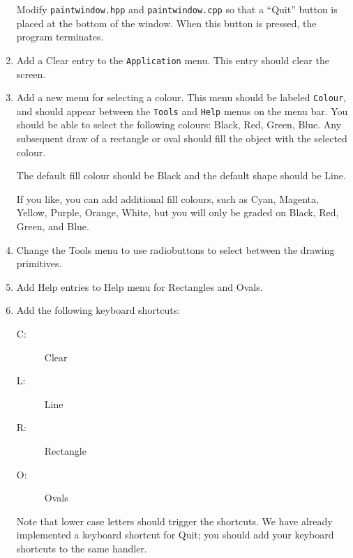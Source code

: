 \begin{enumerate}
                Modify \texttt{paintwindow.hpp} and
                \texttt{paintwindow.cpp} so that a ``Quit'' button is
                placed at the bottom of the window.  When this button
                is pressed, the program terminates.

        \item
                Add a Clear entry to the \texttt{Application} menu.  This entry should
                clear the screen.

        \item
                Add a new menu for selecting a colour.  This menu should
                be labeled \texttt{Colour}, and should appear between the
                \texttt{Tools} and \texttt{Help} menus on the menu bar.  You should
                be able to select the following colours: Black, Red,
                Green, Blue.
                Any subsequent draw of a rectangle or oval should fill
                the object with the selected colour.

                The default fill colour should be Black and the
                default shape should be Line.

                If you like, you can add additional fill colours, such
                as Cyan, Magenta, Yellow, Purple, Orange,
                White, but you will only be graded on Black, Red, Green,
                and Blue.
        \item
                Change the Tools menu to use radiobuttons to select
                between the drawing primitives.

        \item
                Add Help entries to Help menu for Rectangles and Ovals.

        \item
                Add the following keyboard shortcuts:
                \begin{description}
                        \item[C:] Clear
                        \item[L:] Line
                        \item[R:] Rectangle
                        \item[O:] Ovals
                \end{description}
		Note that lower case letters should
		trigger the shortcuts.  We have already implemented
		a keyboard shortcut for Quit; you should add your
		keyboard shortcuts to the same handler.


\end{enumerate}
